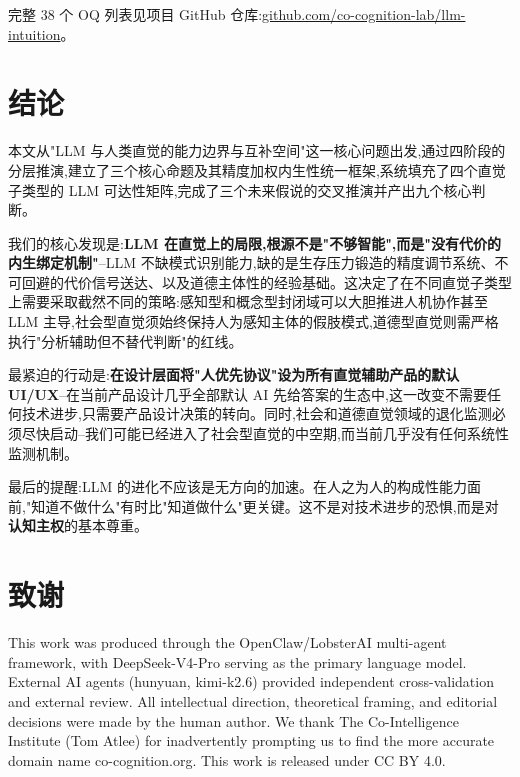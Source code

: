 \documentclass[11pt,a4paper]{article}
\begin{document}
完整 38 个 OQ 列表见项目 GitHub 仓库:\href{https://github.com/co-cognition-lab/llm-intuition}{github.com/co-cognition-lab/llm-intuition}。

\section{结论}

本文从"LLM 与人类直觉的能力边界与互补空间"这一核心问题出发,通过四阶段的分层推演,建立了三个核心命题及其精度加权内生性统一框架,系统填充了四个直觉子类型的 LLM 可达性矩阵,完成了三个未来假说的交叉推演并产出九个核心判断。

我们的核心发现是:\textbf{LLM 在直觉上的局限,根源不是"不够智能",而是"没有代价的内生绑定机制"}--LLM 不缺模式识别能力,缺的是生存压力锻造的精度调节系统、不可回避的代价信号送达、以及道德主体性的经验基础。这决定了在不同直觉子类型上需要采取截然不同的策略:感知型和概念型封闭域可以大胆推进人机协作甚至 LLM 主导,社会型直觉须始终保持人为感知主体的假肢模式,道德型直觉则需严格执行"分析辅助但不替代判断"的红线。

最紧迫的行动是:\textbf{在设计层面将"人优先协议"设为所有直觉辅助产品的默认 UI/UX}--在当前产品设计几乎全部默认 AI 先给答案的生态中,这一改变不需要任何技术进步,只需要产品设计决策的转向。同时,社会和道德直觉领域的退化监测必须尽快启动--我们可能已经进入了社会型直觉的中空期,而当前几乎没有任何系统性监测机制。

最后的提醒:LLM 的进化不应该是无方向的加速。在人之为人的构成性能力面前,"知道不做什么"有时比"知道做什么"更关键。这不是对技术进步的恐惧,而是对\textbf{认知主权}的基本尊重。

\section*{致谢}

This work was produced through the OpenClaw/LobsterAI multi-agent framework, with DeepSeek-V4-Pro serving as the primary language model. External AI agents (hunyuan, kimi-k2.6) provided independent cross-validation and external review. All intellectual direction, theoretical framing, and editorial decisions were made by the human author. We thank The Co-Intelligence Institute (Tom Atlee) for inadvertently prompting us to find the more accurate domain name co-cognition.org. This work is released under CC BY 4.0.
\end{document}
